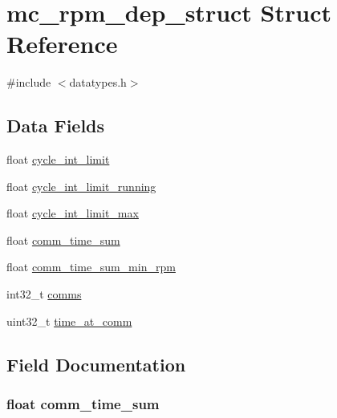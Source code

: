 \hypertarget{structmc__rpm__dep__struct}{}\section{mc\+\_\+rpm\+\_\+dep\+\_\+struct Struct Reference}
\label{structmc__rpm__dep__struct}


{\ttfamily \#include $<$datatypes.\+h$>$}

\subsection*{Data Fields}
\begin{DoxyCompactItemize}
\item 
float \hyperlink{structmc__rpm__dep__struct_a0c4b22dc60c287582302e3b4616f40e9}{cycle\+\_\+int\+\_\+limit}
\item 
float \hyperlink{structmc__rpm__dep__struct_ac5df70776f630c4f834ab3b7ab6b6aad}{cycle\+\_\+int\+\_\+limit\+\_\+running}
\item 
float \hyperlink{structmc__rpm__dep__struct_a041d4ba0303be09df2bcf67b1869365e}{cycle\+\_\+int\+\_\+limit\+\_\+max}
\item 
float \hyperlink{structmc__rpm__dep__struct_ac4b97a81e08b8daeafea910ee057d671}{comm\+\_\+time\+\_\+sum}
\item 
float \hyperlink{structmc__rpm__dep__struct_a001a4ddd0c17d7611243fac30dd323a3}{comm\+\_\+time\+\_\+sum\+\_\+min\+\_\+rpm}
\item 
int32\+\_\+t \hyperlink{structmc__rpm__dep__struct_afe45d132bfaf495685c97e97721151db}{comms}
\item 
uint32\+\_\+t \hyperlink{structmc__rpm__dep__struct_a2818616e9041447e693afed3790e59a9}{time\+\_\+at\+\_\+comm}
\end{DoxyCompactItemize}


\subsection{Field Documentation}
\hypertarget{structmc__rpm__dep__struct_ac4b97a81e08b8daeafea910ee057d671}{}
\subsubsection[{comm\+\_\+time\+\_\+sum}]{\setlength{\rightskip}{0pt plus 5cm}float comm\+\_\+time\+\_\+sum}\label{structmc__rpm__dep__struct_ac4b97a81e08b8daeafea910ee057d671}
\hypertarget{structmc__rpm__dep__struct_a001a4ddd0c17d7611243fac30dd323a3}{}
